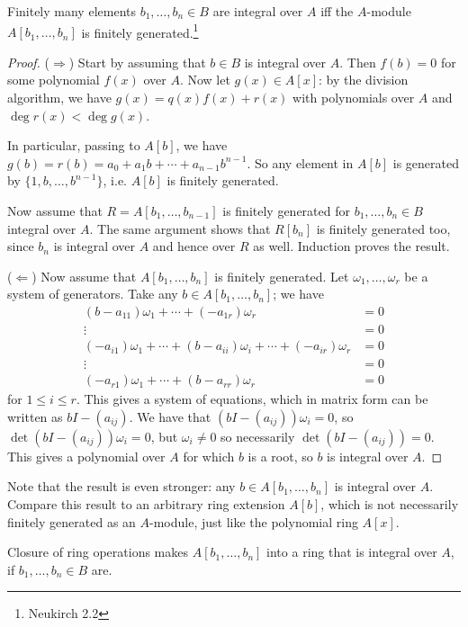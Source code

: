 \begin{prop}
	Finitely many elements $b_1,\dots,b_n\in B$ are integral over $A$ iff the $A$-module $A[b_1,\dots,b_n]$ is finitely generated.\footnote{Neukirch 2.2}
\end{prop}
\begin{proof}
	($\Longrightarrow$) Start by assuming that $b\in B$ is integral over $A$. Then $f(b)=0$ for some polynomial $f(x)$ over $A$. Now let $g(x)\in A[x]$: by the division algorithm, we have $g(x)=q(x)f(x)+r(x)$ with polynomials over $A$ and $\deg r(x) < \deg g(x)$.

	In particular, passing to $A[b]$, we have $g(b)=r(b)=a_0+a_1b+\cdots+a_{n-1}b^{n-1}$. So any element in $A[b]$ is generated by $\{1,b,\dots,b^{n-1}\}$, i.e. $A[b]$ is finitely generated.

	Now assume that $R=A[b_1,\dots,b_{n-1}]$ is finitely generated for $b_1,\dots,b_n\in B$ integral over $A$. The same argument shows that $R[b_n]$ is finitely generated too, since $b_n$ is integral over $A$ and hence over $R$ as well. Induction proves the result.

	($\Longleftarrow$) Now assume that $A[b_1,\dots,b_n]$ is finitely generated. Let $\omega_1,\dots,\omega_r$ be a system of generators. Take any $b\in A[b_1,\dots,b_n]$; we have
	\begin{align*}
		(b-a_{11})\omega_1 + \cdots + (-a_{1r})\omega_r &= 0\\
		\vdots &= 0\\
		(-a_{i1})\omega_1 + \cdots + (b-a_{ii})\omega_i + \cdots + (-a_{ir})\omega_r&=0\\
		\vdots &= 0\\
		(-a_{r1})\omega_1 + \cdots + (b-a_{rr})\omega_r &= 0
	\end{align*}
	for $1\leq i\leq r$. This gives a system of equations, which in matrix form can be written as $bI - (a_{ij})$. We have that $(bI-(a_{ij}))\omega_i = 0$, so $\det(bI-(a_{ij}))\omega_i = 0$, but $\omega_i\neq 0$ so necessarily $\det(bI-(a_{ij}))=0$. This gives a polynomial over $A$ for which $b$ is a root, so $b$ is integral over $A$.
\end{proof}

Note that the result is even stronger: any $b\in A[b_1,\dots,b_n]$ is integral over $A$. Compare this result to an arbitrary ring extension $A[b]$, which is not necessarily finitely generated as an $A$-module, just like the polynomial ring $A[x]$.

Closure of ring operations makes $A[b_1,\dots,b_n]$ into a ring that is integral over $A$, if $b_1,\dots,b_n\in B$ are.


